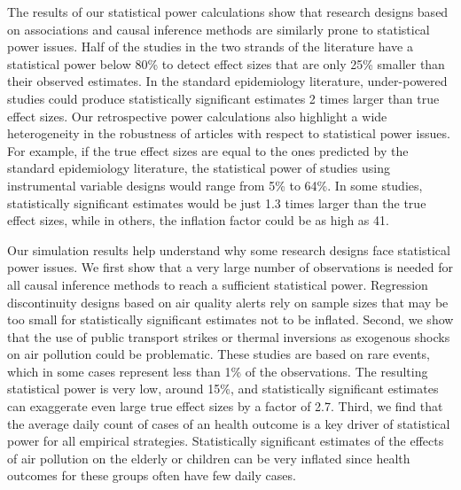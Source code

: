 \documentclass[12pt]{article}
\begin{document}
    The results of our statistical power calculations show that research designs based on associations and causal inference methods are similarly prone to statistical power issues. Half of the studies in the two strands of the literature have a statistical power below 80\% to detect effect sizes that are only 25\% smaller than their observed estimates. In the standard epidemiology literature, under-powered studies could produce statistically significant estimates 2 times larger than true effect sizes. Our retrospective power calculations also highlight a wide heterogeneity in the robustness of articles with respect to statistical power issues. For example, if the true effect sizes are equal to the ones predicted by the standard epidemiology literature, the statistical power of studies using instrumental variable designs would range from 5\% to 64\%. In some studies, statistically significant estimates would be just 1.3 times larger than the true effect sizes, while in others, the inflation factor could be as high as 41.
    
    Our simulation results help understand why some research designs face statistical power issues. We first show that a very large number of observations is needed for all causal inference methods to reach a sufficient statistical power. Regression discontinuity designs based on air quality alerts rely on sample sizes that may be too small for statistically significant estimates not to be inflated. Second, we show that the use of public transport strikes or thermal inversions as exogenous shocks on air pollution could be problematic. These studies are based on rare events, which in some cases represent less than 1\% of the observations. The resulting statistical power is very low, around 15\%, and statistically significant estimates can exaggerate even large true effect sizes by a factor of 2.7. Third, we find that the average daily count of cases of an health outcome is a key driver of statistical power for all empirical strategies. Statistically significant estimates of the effects of air pollution on the elderly or children can be very inflated since health outcomes for these groups often have few daily cases.
\end{document}
